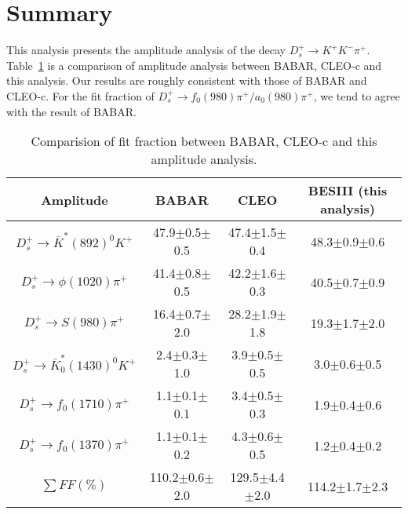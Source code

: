 \section{Summary}
\par{
    This analysis presents the amplitude analysis of the decay $D_{s}^{+} \rightarrow K^{+}K^{-}\pi^{+}$.
    Table~\ref{final-comp} is a comparison of amplitude analysis between BABAR, CLEO-c and this analysis. Our results are roughly consistent with those of BABAR and CLEO-c.
    For the fit fraction of $D_{s}^{+} \rightarrow f_{0}(980)\pi^{+}/a_{0}(980)\pi^{+}$, we tend to agree with the result of BABAR.
    \begin{table}[htbp]
        \caption{Comparision of fit fraction between BABAR, CLEO-c and this amplitude analysis.}
        \label{final-comp}
        \begin{center}
            \begin{tabular}{cccc}
                \toprule\toprule
                Amplitude & BABAR  & CLEO  & BESIII (this analysis)\\
                \hline
                $D_{s}^{+} \rightarrow \bar{K}^{*}(892)^{0}K^{+}$              & 47.9$\pm$0.5$\pm$0.5  & 47.4$\pm$1.5$\pm$0.4& 48.3$\pm$0.9$\pm$0.6 \\
                $D_{s}^{+} \rightarrow \phi(1020)\pi^{+}$                      & 41.4$\pm$0.8$\pm$0.5  & 42.2$\pm$1.6$\pm$0.3& 40.5$\pm$0.7$\pm$0.9 \\
                $D_{s}^{+} \rightarrow S(980)\pi^{+}$    & 16.4$\pm$0.7$\pm$2.0  & 28.2$\pm$1.9$\pm$1.8& 19.3$\pm$1.7$\pm$2.0 \\
                $D_{s}^{+} \rightarrow \bar{K}^{*}_{0}(1430)^{0}K^{+}$         & 2.4$\pm$0.3$\pm$1.0   & 3.9$\pm$0.5$\pm$0.5 & 3.0$\pm$0.6$\pm$0.5  \\
                $D_{s}^{+} \rightarrow f_{0}(1710)\pi^{+}$                     & 1.1$\pm$0.1$\pm$0.1   & 3.4$\pm$0.5$\pm$0.3 & 1.9$\pm$0.4$\pm$0.6  \\
                $D_{s}^{+} \rightarrow f_{0}(1370)\pi^{+}$                     & 1.1$\pm$0.1$\pm$0.2   & 4.3$\pm$0.6$\pm$0.5 & 1.2$\pm$0.4$\pm$0.2  \\
                $\begin{matrix}\sum FF(\%)\end{matrix}$                          & 110.2$\pm$0.6$\pm$2.0 & 129.5$\pm$4.4$\pm$2.0 & 114.2$\pm$1.7$\pm$2.3\\

\end{tabular}
\end{center}
\end{table}}
